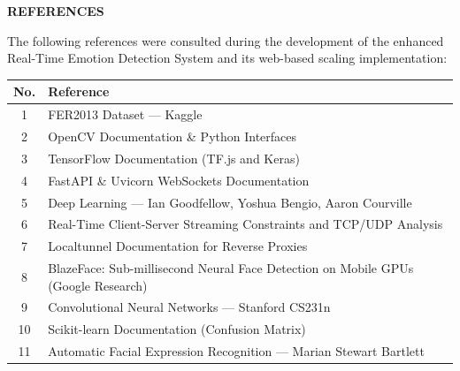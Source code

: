 \documentclass[12pt,a4paper]{report}
\begin{document}
\clearpage


\begin{center}
{\Huge\bfseries REFERENCES}
\end{center}

\vspace{0.8cm}

The following references were consulted during the development of the enhanced
Real-Time Emotion Detection System and its web-based scaling implementation:

\begin{table}[h]
\centering
\begin{tabular}{|c|p{11cm}|}
\hline
\textbf{No.} & \textbf{Reference} \\
\hline
1 & FER2013 Dataset — Kaggle \\
\hline
2 & OpenCV Documentation \& Python Interfaces \\
\hline
3 & TensorFlow Documentation (TF.js and Keras) \\
\hline
4 & FastAPI \& Uvicorn WebSockets Documentation \\
\hline
5 & Deep Learning — Ian Goodfellow, Yoshua Bengio, Aaron Courville \\
\hline
6 & Real-Time Client-Server Streaming Constraints and TCP/UDP Analysis \\
\hline
7 & Localtunnel Documentation for Reverse Proxies \\
\hline
8 & BlazeFace: Sub-millisecond Neural Face Detection on Mobile GPUs (Google Research) \\
\hline
9 & Convolutional Neural Networks — Stanford CS231n \\
\hline
10 & Scikit-learn Documentation (Confusion Matrix) \\
\hline
11 & Automatic Facial Expression Recognition — Marian Stewart Bartlett \\
\hline
\end{tabular}
\end{table}
\end{document}
